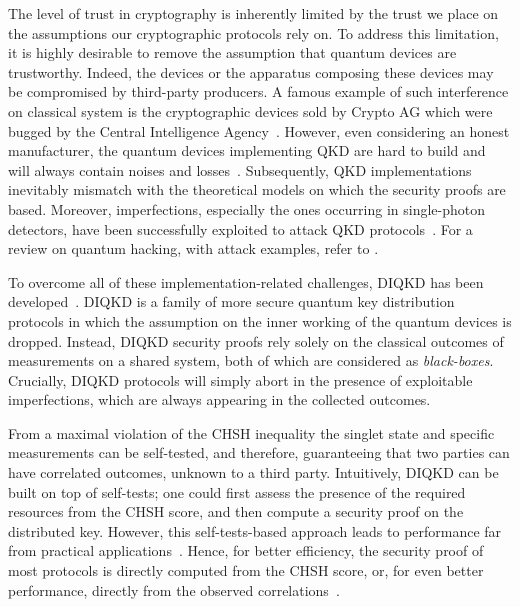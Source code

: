 \medbreak

The level of trust in cryptography is inherently limited by the trust we place on the assumptions our cryptographic protocols rely on. 
To address this limitation, it is highly desirable to remove the assumption that quantum devices are trustworthy.
Indeed, the devices or the apparatus composing these devices may be compromised by third-party producers.
A famous example of such interference on classical system is the cryptographic devices sold by Crypto AG which were bugged by the Central Intelligence Agency~\cite{Miller2020}.
However, even considering an honest manufacturer, the quantum devices implementing QKD are hard to build and will always contain noises and losses~\cite{Diamanti2016,Xu2020}.
Subsequently, QKD implementations inevitably mismatch with the theoretical models on which the security proofs are based. 
Moreover, imperfections, especially the ones occurring in single-photon detectors, have been successfully exploited to attack QKD protocols~\cite{Fung2007,Lydersen2010,Gerhardt2011,Weier2011}. 
For a review on quantum hacking, with attack examples, refer to \cite{Lo2014}.

\medbreak

To overcome all of these implementation-related challenges, \acrfull{DIQKD} has been developed~\cite{Acin2007,Vazirani2014,ArnonFriedman2018}.
\acrshort{DIQKD} is a family of more secure quantum key distribution protocols in which the assumption on the inner working of the quantum devices is dropped.
Instead, DIQKD security proofs rely solely on the classical outcomes of measurements on a shared system, both of which are considered as \textit{black-boxes}.
Crucially, DIQKD protocols will simply abort in the presence of exploitable imperfections, which are always appearing in the collected outcomes.

\medbreak

From a maximal violation of the CHSH inequality the singlet state and specific measurements can be self-tested, and therefore, guaranteeing that two parties can have correlated outcomes, unknown to a third party.
Intuitively, DIQKD can be built on top of self-tests; one could first assess the presence of the required resources from the CHSH score, and then compute a security proof on the distributed key.
However, this self-tests-based approach leads to performance far from practical applications~\cite{Fu2018,Kundu2022}.
Hence, for better efficiency, the security proof of most protocols is directly computed from the CHSH score, or, for even better performance, directly from the observed correlations~\cite{Pironio2009,Ho2020,Sekatski2021,Woodhead2021,Brown2021}.
